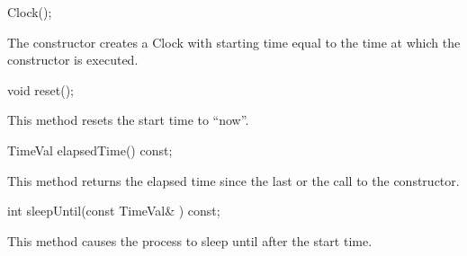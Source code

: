 \begin{example}
Clock();
\end{example}

The constructor creates a Clock with starting time equal to the
time at which the constructor is executed.

\begin{example}
void reset();
\end{example}

This method resets the start time to ``now''.

\begin{example}
TimeVal elapsedTime() const;
\end{example}

This method returns the elapsed time since the last  or
the call to the constructor.

\begin{example}
int sleepUntil(const TimeVal& ) const;
\end{example}

This method causes the process to sleep until  after the
start time.

